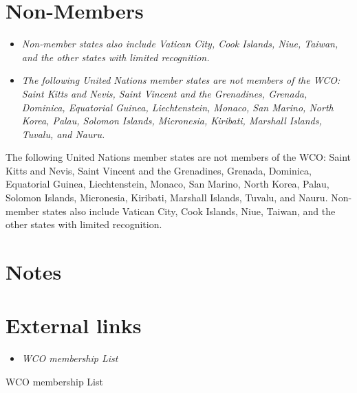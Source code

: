 \section{Non-Members}\label{non-members}

\begin{itemize}
\item
  \emph{Non-member states also include Vatican City, Cook Islands, Niue,
  Taiwan, and the other states with limited recognition.}
\item
  \emph{The following United Nations member states are not members of
  the WCO: Saint Kitts and Nevis, Saint Vincent and the Grenadines,
  Grenada, Dominica, Equatorial Guinea, Liechtenstein, Monaco, San
  Marino, North Korea, Palau, Solomon Islands, Micronesia, Kiribati,
  Marshall Islands, Tuvalu, and Nauru.}
\end{itemize}

The following United Nations member states are not members of the WCO:
Saint Kitts and Nevis, Saint Vincent and the Grenadines, Grenada,
Dominica, Equatorial Guinea, Liechtenstein, Monaco, San Marino, North
Korea, Palau, Solomon Islands, Micronesia, Kiribati, Marshall Islands,
Tuvalu, and Nauru. Non-member states also include Vatican City, Cook
Islands, Niue, Taiwan, and the other states with limited recognition.

\section{Notes}\label{notes}

\section{External links}\label{external-links}

\begin{itemize}
\item
  \emph{WCO membership List}
\end{itemize}

WCO membership List
